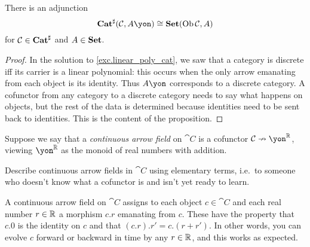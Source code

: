 \documentclass[Book-Poly]{subfiles}
\begin{document}
\begin{proposition}
There is an adjunction
\[
\smcat^\sharp(\cat{C},A\yon)\cong\smset(\Ob\cat{C},A)
\]
for $\mathcal{C}\in\mathbf{Cat}^\sharp$ and $A\in\mathbf{Set}$.
\end{proposition}
\begin{proof}
In the solution to \cref{exc.linear_poly_cat}, we saw that a category is discrete iff its carrier is a linear polynomial: this occurs when the only arrow emanating from each object is its identity. Thus $A\yon$ corresponds to a discrete category. A cofunctor from any category to a discrete category needs to say what happens on objects, but the rest of the data is determined because identities need to be sent back to identities. This is the content of the proposition.
\end{proof}

\begin{exercise}
Suppose we say that a \emph{continuous arrow field} on $\cat{C}$ is a cofunctor $\cat{C}\cof\yon^\rr$, viewing $\yon^\rr$ as the monoid of real numbers with addition.

Describe continuous arrow fields in $\cat{C}$ using elementary terms, i.e.\ to someone who doesn't know what a cofunctor is and isn't yet ready to learn.
\begin{solution}
A continuous arrow field on $\cat{C}$ assigns to each object $c\in\cat{C}$ and each real number $r\in\mathbb{R}$ a morphism $c.r$ emanating from $c$. These have the property that $c.0$ is the identity on $c$ and that $(c.r).r'=c.(r+r')$. In other words, you can evolve $c$ forward or backward in time by any $r\in\mathbb{R}$, and this works as expected.
\end{solution}
\end{exercise}
\end{document}
